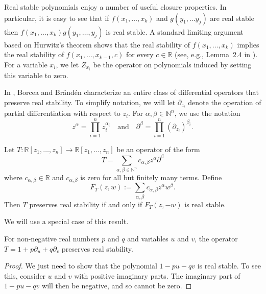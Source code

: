 \documentclass[11pt]{article}
\renewcommand{\H}{\mathcal{H}}
\newcommand{\R}{\mathbb{R}}
\begin{document}
Real stable polynomials enjoy a number of useful closure properties. 
In particular, it is easy to see that if $f(x_1, \dots, x_k)$ and $g(y_{1}, \dots y_j)$ are real stable then $f(x_1, \dots, x_k) g(y_1, \dots, y_j)$ is real stable.
A standard limiting argument based on Hurwitz's theorem shows that the real stability of $f(x_1, \dots, x_k)$ implies the
real stability of $f(x_1, \dots, x_{k-1}, c)$ for every  $c \in \R$ (see, e.g., Lemma~2.4 in \cite{wagner}).
For a variable $x_{i}$, we let $Z_{x_{i}}$ be the operator on polynomials induced by setting this variable to zero.


In \cite{BBWeylAlgebra}, Borcea and Br\"{a}nd\'{e}n characterize an entire class of differential operators that preserve real stability.
To simplify notation, we will let $\partial_{z_{i}}$ denote the operation of partial differentiation
  with respect to $z_{i}$.
For $\alpha , \beta \in \mathbb{N}^n$, we use the notation
\[
  z^{\alpha} = \prod_{i=1}^{n} z_{i}^{\alpha_i}
\quad
\text{and}
\quad 
  \partial^{\beta} = \prod_{i=1}^{n} \left(\partial_{z_i}\right)^{\beta_{i}}.
\]


\begin{theorem} \label{Weyl}
Let $T : \R[z_1, \dots , z_n ] \to  \R[z_1, \dots , z_n ]$ be an operator of the form
\[
T = \sum_{\alpha , \beta \in \mathbb{N}^n} c_{\alpha, \beta} z^\alpha \partial^{\beta}
\]
where 
 $c_{\alpha, \beta} \in \mathbb{R}$ and $c_{\alpha ,\beta}$
  is zero for all but finitely many terms.
Define
\[ 
F_T(z,w) := \sum_{\alpha, \beta} c_{\alpha, \beta} z^{\alpha}w^{\beta}.
\]
Then $T$ preserves real stability if and only if $F_T(z, -w)$ is real stable.
\end{theorem}

We will use a special case of this result.
\begin{corollary}\label{cor:Tpreserves}
For non-negative real numbers $p$ and $q$ and variables $u$ and $v$,
the operator $T = 1 + p \partial_{u} + q \partial_{v}$ preserves real stability.
\end{corollary}
\begin{proof}
We just need to show that the polynomial $1 - p u - q v$ is real stable.
To see this, consider $u$ and $v$ with positive imaginary parts.
The imaginary part of $1 - p u - q v$ will then be negative, and
  so cannot be zero.
\end{proof}
\end{document}
